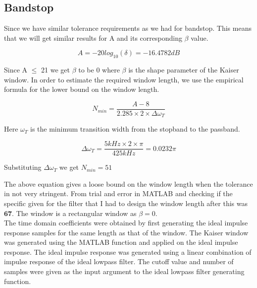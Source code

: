 \documentclass{scrartcl}
\begin{document}
\newpage
\subsection{Bandstop}
Since we have similar tolerance requirements as we had for bandstop. This means that we will get similar results for A and its corresponding $\beta$ value.

\begin{equation}
    A = - 20log_{10}(\delta) = -16.4782 dB
\end{equation}

Since A $\leq$ 21 we get $\beta$ to be 0 where $\beta$ is the shape parameter of the Kaiser window.
In order to estimate the required window length, we use the empirical formula for the lower bound on the window length.

\begin{equation}
    N_{min} = \frac{A - 8}{2.285\times2\times\Delta\omega_{T}}
\end{equation}

Here $\omega_{T}$ is the minimum transition width from the stopband to the passband.

\begin{equation}
    \Delta\omega_{T} = \frac{5kHz\times2\times\pi}{425kHz} = 0.0232\pi
\end{equation}

Substituting $\Delta\omega_{T}$ we get $N_{min} = 51$

The above equation gives a loose bound on the window length when the tolerance in not very stringent. From trial and error in MATLAB and checking if the specific given for the filter that I had to design the window length after this was $\textbf{67}$. The window is a rectangular window as $\beta = 0$.\\

The time domain coefficients were obtained by first generating the ideal impulse response samples for the same length as that of the window. The Kaiser window was generated using the MATLAB function and applied  on the ideal impulse response. The ideal impulse response was generated using a linear combination of impulse response of the ideal lowpass filter. The cutoff value and number of samples were given as the input argument to the ideal lowpass filter generating function.\\
\end{document}
